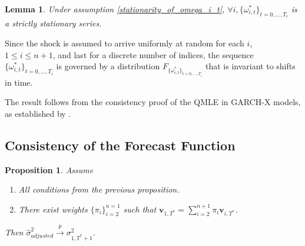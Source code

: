 \documentclass[11pt]{article}
\newcommand{\weight}{\pi}
\newtheorem{lem}{Lemma}
\newtheorem{prop}{Proposition}
\theoremstyle{definition}
\newenvironment{proof-of-proposition}[1][{}]{\noindent{\bf
    Proof of Proposition {#1}}
  \hspace*{.5em}}{\qed\bigskip\\}
\newenvironment{proof-of-lemma}[1][{}]{\noindent{\bf
    Proof of Lemma {#1}}
  \hspace*{.5em}}{\qed\bigskip\\}
\begin{document}
\begin{lem}
  Under assumption \ref{stationarity_of_omega_i_t}, $\forall i, \{\omega_{i,t}^{*}\}_{t=0,...,T_i}$ is a strictly stationary series.
\end{lem}

\begin{proof-of-lemma}
Since the shock is assumed to arrive uniformly at random for each $i$, $1 \leq i \leq n + 1$, and last for a discrete number of indices, the sequence $\{\omega_{i,t}^{*}\}_{t=0,...,T_i}$ is governed by a distribution $F_{\{\omega_{i,t}^{*}\}_{t=0,...,T_i}}$ that is invariant to shifts in time.
\end{proof-of-lemma}

\begin{proof-of-proposition}
The result follows from the consistency proof of the QMLE in GARCH-X models, as established by \citet{han2014asymptotic}. 
\end{proof-of-proposition}

  \subsection{Consistency of the Forecast Function}
  \begin{prop}\label{sigma_consistency}
    Assume
    \begin{enumerate}
      \item All conditions from the previous proposition.
      \item There exist weights $\{\pi_{i}\}_{i=2}^{n=1}$ such that $\textbf{v}_{1,T^{*}} = \sum^{n+1}_{i=2}\weight_{i} \textbf{v}_{i,T^{*}}$.
     \end{enumerate}
  Then $\hat\sigma^{2}_{adjusted}\xrightarrow{p}\sigma^{2}_{1,T^{*}+1}$. 
  \end{prop}
\end{document}
